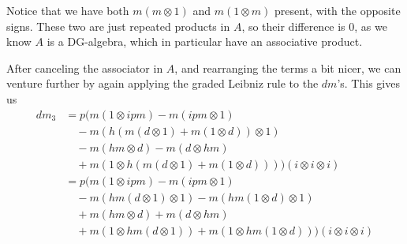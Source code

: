 Notice that we have both $m(m\otimes 1)$ and $m(1\otimes m)$ present, with the opposite signs. These two are just repeated products in $A$, so their difference is $0$, as we know $A$ is a DG-algebra, which in particular have an associative product.

After canceling the associator in $A$, and rearranging the terms a bit nicer, we can venture further by again applying the graded Leibniz rule to the $dm$'s. This gives us
\begin{align*}
    dm_3 
    &=
    p(m(1\otimes ipm)-m(ipm\otimes 1) \\
    &\quad -m(h(m(d\otimes 1)+m(1\otimes d))\otimes 1) \\
    &\quad -m(hm\otimes d)-m(d\otimes hm) \\
    &\quad +m(1\otimes h(m(d\otimes 1)+m(1\otimes d))))(i\otimes i\otimes i) \\
    &=
    p(m(1\otimes ipm)-m(ipm\otimes 1) \\
    &\quad - m(hm(d\otimes 1)\otimes 1) - m(hm(1\otimes d)\otimes 1) \\
    &\quad +m(hm\otimes d)+m(d\otimes hm) \\
    &\quad +m(1\otimes hm(d\otimes 1))+m(1\otimes hm(1\otimes d)))(i\otimes i\otimes i)
\end{align*}

